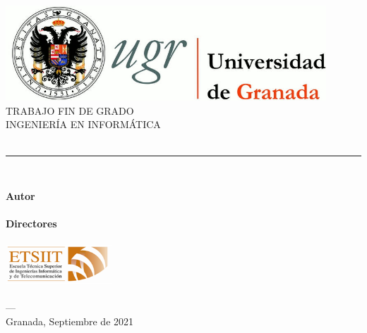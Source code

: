 \begin{titlepage}
 
 
\newlength{\centeroffset}
\setlength{\centeroffset}{-0.5\oddsidemargin}
\addtolength{\centeroffset}{0.5\evensidemargin}
\thispagestyle{empty}

\noindent\hspace*{\centeroffset}\begin{minipage}{\textwidth}

\centering
\includegraphics[width=0.9\textwidth]{imagenes/logo_ugr.jpg}\\[1.4cm]

\textsc{ \Large TRABAJO FIN DE GRADO\\[0.2cm]}
\textsc{ INGENIERÍA EN INFORMÁTICA}\\[1cm]
% 
{\Huge\bfseries \myTitle \\
}
\noindent\rule[-1ex]{\textwidth}{3pt}\\[3.5ex]
\end{minipage}

\vspace{1.5cm}
\noindent\hspace*{\centeroffset}\begin{minipage}{\textwidth}
\centering

\textbf{Autor}\\ {\myName }\\[2.5ex]
\textbf{Directores}\\
{\myProf}\\[2cm]
\includegraphics[width=0.3\textwidth]{imagenes/etsiit_logo.png}\\[0.1cm]
\textsc{\myFaculty }\\
\textsc{---}\\
Granada, Septiembre de 2021
\end{minipage}
\end{titlepage}


